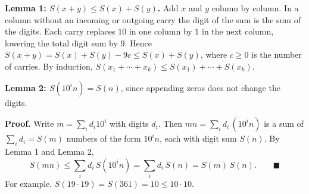 \textbf{Lemma 1: $S(x+y)\le S(x)+S(y)$.} Add $x$ and $y$ column by column. In a column without an incoming or outgoing carry the digit of the sum is the sum of the digits. Each carry replaces $10$ in one column by $1$ in the next column, lowering the total digit sum by $9$. Hence $S(x+y)=S(x)+S(y)-9c\le S(x)+S(y)$, where $c\ge0$ is the number of carries. By induction, $S(x_1+\cdots+x_k)\le S(x_1)+\cdots+S(x_k)$.

\textbf{Lemma 2: $S(10^i n)=S(n)$}, since appending zeros does not change the digits.

\textbf{Proof.} Write $m=\sum_i d_i10^i$ with digits $d_i$. Then $mn=\sum_i d_i\,(10^in)$ is a sum of $\sum_i d_i=S(m)$ numbers of the form $10^in$, each with digit sum $S(n)$. By Lemma 1 and Lemma 2,
\[
S(mn)\le\sum_i d_i\,S(10^in)=\sum_i d_i\,S(n)=S(m)\,S(n).\qquad\blacksquare
\]
For example, $S(19\cdot19)=S(361)=10\le10\cdot10$.
